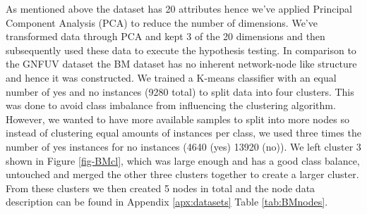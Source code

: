 \documentclass{mpaper}
\begin{document}
As mentioned above the dataset has 20 attributes hence we've applied Principal Component Analysis (PCA) to reduce the number of dimensions. We've transformed data through PCA and kept 3 of the 20 dimensions and then subsequently used these data to execute the hypothesis testing. In comparison to the GNFUV dataset the BM dataset has no inherent network-node like structure and hence it was constructed. We trained a K-means classifier with an equal number of yes and no instances (9280 total) to split data into four clusters. This was done to avoid class imbalance from influencing the clustering algorithm. However, we wanted to have more available samples to split into more nodes so instead of clustering equal amounts of instances per class, we used three times the number of yes instances for no instances (4640 (yes) 13920 (no)). We left cluster 3 shown in Figure \ref{fig-BMcl}, which was large enough and has a good class balance, untouched and merged the other three clusters together to create a larger cluster. From these clusters we then created 5 nodes in total and the node data description can be found in Appendix \ref{apx:datasets} Table \ref{tab:BMnodes}. 
\end{document}
